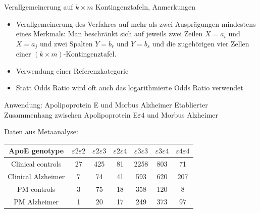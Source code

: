 \documentclass[
  10pt,
  ignorenonframetext,
]{beamer}
\providecommand{\tightlist}{%
  \setlength{\itemsep}{0pt}\setlength{\parskip}{0pt}}
\begin{document}
\begin{frame}{Verallgemeinerung auf \(k\times m\) Kontingenztafeln,
Anmerkungen}
\label{verallgemeinerung-auf-ktimes-m-kontingenztafeln-anmerkungen}
\begin{itemize}
\tightlist
\item
  Verallgemeinerung des Verfahres auf mehr als zwei Ausprägungen
  mindestens eines Merkmals: Man beschränkt sich auf jeweils zwei Zeilen
  \(X=a_i\) und \(X=a_j\) und zwei Spalten \(Y=b_r\) und \(Y=b_s\) und
  die zugehörigen vier Zellen einer \((k \times m)\)-Kontingenztafel.
\item
  Verwendung einer Referenzkategorie
\item
  Statt Odds Ratio wird oft auch das logarithmierte Odds Ratio verwendet
\end{itemize}
\end{frame}

\begin{frame}{Anwendung: Apolipoprotein E und Morbus Alzheimer}
\label{anwendung-apolipoprotein-e-und-morbus-alzheimer}
Etablierter Zusammenhang zwischen Apolipoprotein E\(\varepsilon4\) und
Morbus Alzheimer

\vspace{0.5cm}

Daten aus Metaanalyse:

\vspace{0.3cm}

\begin{tabular}{c| c c c c c |c}
  ApoE genotype   & $\varepsilon2\varepsilon2$ & $\varepsilon2\varepsilon3$   & $\varepsilon2\varepsilon4$
  & $\varepsilon3\varepsilon3$  & $\varepsilon3\varepsilon4$ & $\varepsilon4\varepsilon4$ \\\hline
  Clinical controls & 27& 425&    81& 2258&   803&    71\\
  Clinical Alzheimer& 7   &74&    41& 593&    620&    207\\\hline \hline
  PM controls &3  &75&    18& 358 &120&   8\\
  PM Alzheimer    &1  &20&    17& 249&    373&    97\\
\end{tabular}
\end{frame}
\end{document}
